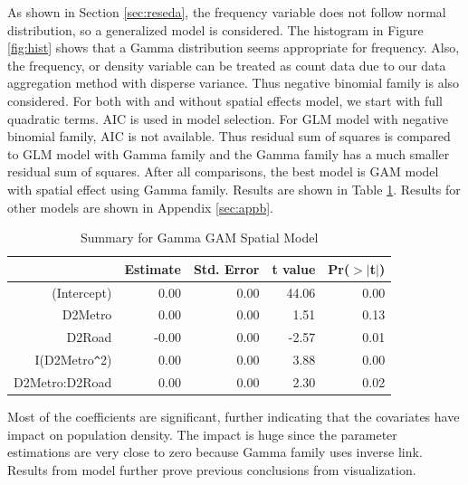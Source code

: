 \documentclass[hidelinks,12pt]{article}
\begin{document}
	As shown in Section \ref{sec:reseda}, the frequency variable does not follow normal distribution, so a generalized model is considered. The histogram in Figure \ref{fig:hist} shows that a Gamma distribution seems appropriate for frequency. Also, the frequency, or density variable can be treated as count data due to our data aggregation method with disperse variance. Thus negative binomial family is also considered. For both with and without spatial effects model, we start with full quadratic terms. AIC is used in model selection. For GLM model with negative binomial family, AIC is not available. Thus residual sum of squares is compared to GLM model with Gamma family and the Gamma family has a much smaller residual sum of squares. After all comparisons, the best model is GAM model with spatial effect using Gamma family. Results are shown in Table \ref{tbl:bestx}. Results for other models are shown in Appendix \ref{sec:appb}.	
	\begin{table}[ht]
		\centering
		\caption{Summary for Gamma GAM Spatial Model \label{tbl:bestx}}
		\begin{tabular}{rrrrr}
			\hline
			& Estimate & Std. Error & t value & Pr($>$$|$t$|$) \\ 
			\hline
			(Intercept) & 0.00 & 0.00 & 44.06 & 0.00 \\ 
			D2Metro & 0.00 & 0.00 & 1.51 & 0.13 \\ 
			D2Road & -0.00 & 0.00 & -2.57 & 0.01 \\ 
			I(D2Metro\verb|^|2) & 0.00 & 0.00 & 3.88 & 0.00 \\ 
			D2Metro:D2Road & 0.00 & 0.00 & 2.30 & 0.02 \\ 
			\hline
		\end{tabular}
	\end{table}

	Most of the coefficients are significant, further indicating that the covariates have impact on population density. The impact is huge since the parameter estimations are very close to zero because Gamma family uses inverse link. Results from model further prove previous conclusions from visualization.
	
\end{document}
